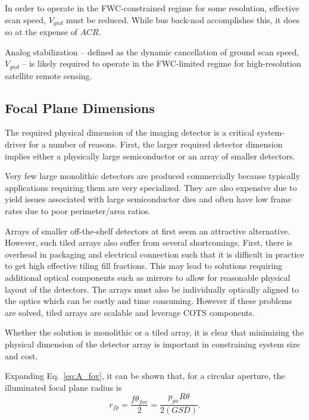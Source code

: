 \documentclass[]{spieman}  %
\begin{document}
In order to operate in the FWC-constrained regime for some resolution, effective scan speed, $V_{gnd}$ must be reduced.  While bus back-nod accomplishes this, it does so at the expense of $ACR$.

\begin{observation}
Analog stabilization -- defined as the dynamic cancellation of ground scan speed, $V_{gnd}$ -- is likely required to operate in the FWC-limited regime for high-resolution satellite remote sensing.
\end{observation}

\subsection{Focal Plane Dimensions}
\label{sec:fp_dimensions}
The required physical dimension of the imaging detector is a critical system-driver for a number of reasons.  First, the larger required detector dimension implies either a physically large semiconductor or an array of smaller detectors.  

Very few large monolithic detectors are produced commercially because typically applications requiring them are very specialized.  They are also expensive due to yield issues associated with large semiconductor dies and often have low frame rates due to poor perimeter/area ratios.

Arrays of smaller off-the-shelf detectors at first seem an attractive alternative.  However, such tiled arrays also suffer from several shortcomings.  First, there is overhead in packaging and electrical connection such that it is difficult in practice to get high effective tiling fill fractions.  This may lead to solutions requiring additional optical components such as mirrors to allow for reasonable physical layout of the detectors.  The arrays must also be individually optically aligned to the optics which can be costly and time consuming. However if these problems are solved, tiled arrays are scalable and leverage COTS components.

Whether the solution is monolithic or a tiled array, it is clear that minimizing the physical dimension of the detector array is important in constraining system size and cost.

Expanding Eq.~\eqref{eq:A_fov}, it can be shown that, for a circular aperture, the illuminated focal plane radius is
\begin{equation}
    \label{eq:r_fp}
    r_{fp} = \frac{f\theta_{fov}}{2} = \frac{p_{px}R\theta}{2 (GSD)}.
\end{equation}
\end{document}
